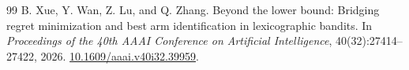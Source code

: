 \documentclass[11pt]{article}
\theoremstyle{definition}
\begin{document}
\begin{thebibliography}{99}
B. Xue, Y. Wan, Z. Lu, and Q. Zhang.
\newblock Beyond the lower bound: Bridging regret minimization and best arm identification in lexicographic bandits.
\newblock In \emph{Proceedings of the 40th AAAI Conference on Artificial Intelligence}, 40(32):27414--27422, 2026.
\newblock \href{https://doi.org/10.1609/aaai.v40i32.39959}{10.1609/aaai.v40i32.39959}.

\end{thebibliography}
\end{document}
